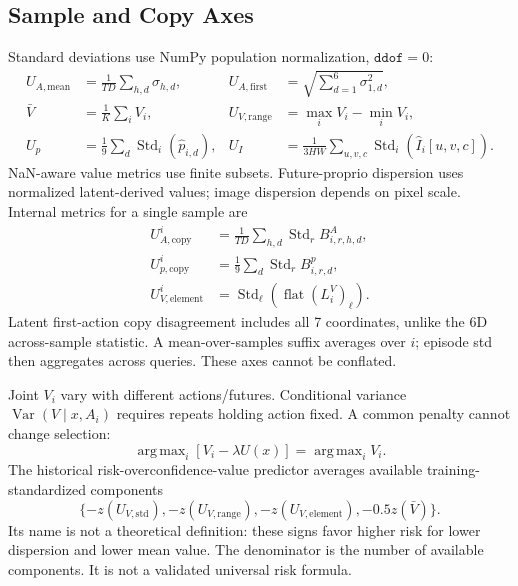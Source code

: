 \documentclass{article}
\DeclareMathOperator*{\argmax}{arg\,max}
\DeclareMathOperator{\Std}{Std}
\begin{document}
\subsection{Sample and Copy Axes}
Standard deviations use NumPy population normalization, $\texttt{ddof}=0$:
\begin{align}
U_{A,\mathrm{mean}}&=\frac1{TD}\sum_{h,d}\sigma_{h,d},&
U_{A,\mathrm{first}}&=\sqrt{\sum_{d=1}^{6}\sigma_{1,d}^2},\\
\bar V&=\frac1K\sum_iV_i,&U_{V,\mathrm{range}}&=\max_iV_i-\min_iV_i,\\
U_p&=\frac19\sum_d\Std_i(\widehat p_{i,d}),&
U_I&=\frac1{3HW}\sum_{u,v,c}\Std_i(\widehat I_i[u,v,c]).
\end{align}
NaN-aware value metrics use finite subsets. Future-proprio dispersion uses
normalized latent-derived values; image dispersion depends on pixel scale.
Internal metrics for a single sample are
\begin{align}
U^i_{A,\mathrm{copy}}&=\frac1{TD}\sum_{h,d}\Std_r B^A_{i,r,h,d},\\
U^i_{p,\mathrm{copy}}&=\frac19\sum_d\Std_r B^p_{i,r,d},\\
U^i_{V,\mathrm{element}}&=\Std_\ell(\operatorname{flat}(L_i^V)_\ell).
\end{align}
Latent first-action copy disagreement includes all 7 coordinates, unlike the
6D across-sample statistic. A mean-over-samples suffix averages over $i$;
episode std then aggregates across queries. These axes cannot be conflated.

Joint $V_i$ vary with different actions/futures. Conditional variance
$\operatorname{Var}(V\mid x,A_i)$ requires repeats holding action fixed.
A common penalty cannot change selection:
\begin{equation}
\argmax_i[V_i-\lambda U(x)]=\argmax_iV_i.
\end{equation}
The historical risk-overconfidence-value predictor averages available
training-standardized components
\begin{equation}
\{-z(U_{V,\mathrm{std}}),-z(U_{V,\mathrm{range}}),
-z(U_{V,\mathrm{element}}),-0.5z(\bar V)\}.
\end{equation}
Its name is not a theoretical definition: these signs favor higher risk
for lower dispersion and lower mean value. The denominator is the number
of available components. It is not a validated universal risk formula.
\end{document}
